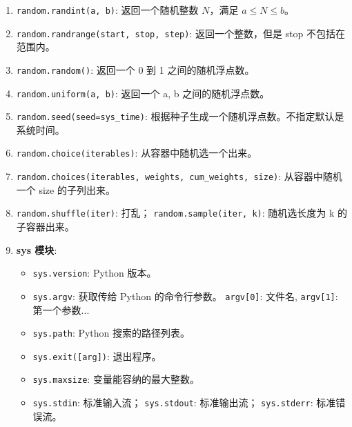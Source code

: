 \documentclass[a4paper, 12pt]{article}
\newcommand{\code}[1]{\texttt{\color{blue!60!black}#1}}
\newcommand{\kw}[1]{\textbf{#1}} %
\newcommand{\threedigits}[1]{%
  \ifnum#1<10 00#1%
  \else\ifnum#1<100 0#1%
  \else #1%
  \fi\fi%
}
\begin{document}
\begin{enumerate}[label=\textbf{\protect\threedigits{\value*}.}, leftmargin=3.5em, itemsep=0.8ex, parsep=0.5ex]
    \item \code{random.randint(a, b)}: 返回一个随机整数 $N$，满足 $a \le N \le b$。
    
    \item \code{random.randrange(start, stop, step)}: 返回一个整数，但是 stop 不包括在范围内。
    
    \item \code{random.random()}: 返回一个 0 到 1 之间的随机浮点数。
    
    \item \code{random.uniform(a, b)}: 返回一个 a, b 之间的随机浮点数。
    
    \item \code{random.seed(seed=sys\_time)}: 根据种子生成一个随机浮点数。不指定默认是系统时间。
    
    \item \code{random.choice(iterables)}: 从容器中随机选一个出来。
    
    \item \code{random.choices(iterables, weights, cum\_weights, size)}: 从容器中随机一个 size 的子列出来。
    
    \item \code{random.shuffle(iter)}: 打乱； \code{random.sample(iter, k)}: 随机选长度为 k 的子容器出来。
    
    \item \kw{sys 模块}:
    \begin{itemize}
        \item \code{sys.version}: Python 版本。
        \item \code{sys.argv}: 获取传给 Python 的命令行参数。 \code{argv[0]}: 文件名, \code{argv[1]}: 第一个参数...
        \item \code{sys.path}: Python 搜索的路径列表。
        \item \code{sys.exit([arg])}: 退出程序。
        \item \code{sys.maxsize}: 变量能容纳的最大整数。
        \item \code{sys.stdin}: 标准输入流； \code{sys.stdout}: 标准输出流； \code{sys.stderr}: 标准错误流。
    \end{itemize}
    

\end{enumerate}
\end{document}
